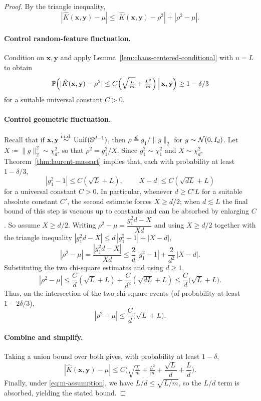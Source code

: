 \begin{proof}
By the triangle inequality,
\[
    |\hat K(\mathbf{x},\mathbf{y}) - \mu|
    \le
    |\hat K(\mathbf{x},\mathbf{y}) - \rho^2| + |\rho^2 - \mu|.
\]

\paragraph{Control random-feature fluctuation.}
Condition on $\mathbf{x},\mathbf{y}$ and apply Lemma~\ref{lem:chaos-centered-conditional} with $u=L$ to obtain
\[
    \mathbb{P}\Big(
        |\hat K(\mathbf{x},\mathbf{y}) - \rho^2|
        \le
        C\Big(\sqrt{\tfrac{L}{m}} + \tfrac{L^2}{m}\Big)
        \,\Big|\, \mathbf{x},\mathbf{y}
    \Big)
    \ge 1-\delta/3
\]
for a suitable universal constant $C>0$.

\paragraph{Control geometric fluctuation.}
Recall that if $\mathbf{x},\mathbf{y} \stackrel{\text{i.i.d.}}{\sim} \mathrm{Unif}(\mathbb{S}^{d-1})$, then $\rho \stackrel{d}{=} g_{1}/\|g\|_{2}$ for $g \sim \mathcal{N}(0,I_{d})$.
Let $X \coloneqq \|g\|_{2}^2 \sim \chi^2_{d}$, so that $\rho^2 = g_1^2/X$.
Since $g_1^2 \sim \chi^2_1$ and $X \sim \chi^2_d$, Theorem~\ref{thm:laurent-massart} implies that, each with probability at least $1-\delta/3$,
\[
    |g_1^2 - 1| \le C(\sqrt{L} + L),
    \qquad
    |X - d| \le C(\sqrt{dL} + L)
\]
for a universal constant $C>0$.
In particular, whenever $d \ge C'L$ for a suitable absolute constant $C'$, the second estimate forces $X \ge d/2$; when $d \lesssim L$ the final bound of this step is vacuous up to constants and can be absorbed by enlarging $C$. So assume $X \ge d/2$. Writing $\rho^2 - \mu = \dfrac{g_1^2 d - X}{Xd}$ and using $X \ge d/2$ together with the triangle inequality $|g_1^2 d - X| \le d\,|g_1^2 - 1| + |X - d|$,
\[
    |\rho^2 - \mu|
    =
    \frac{|g_1^2 d - X|}{Xd}
    \le
    \frac{2}{d}\,|g_1^2 - 1| + \frac{2}{d^2}\,|X - d|.
\]
Substituting the two chi-square estimates and using $d \ge 1$,
\[
    |\rho^2 - \mu|
    \le
    \frac{C}{d}(\sqrt{L} + L) + \frac{C}{d^2}(\sqrt{dL} + L)
    \le
    \frac{C}{d}\big(\sqrt{L} + L\big).
\]
Thus, on the intersection of the two chi-square events (of probability at least $1-2\delta/3$),
\[
    |\rho^2 - \mu|
    \le
    \frac{C}{d}\big(\sqrt{L} + L\big).
\]

\paragraph{Combine and simplify.}
Taking a union bound over both gives, with probability at least $1-\delta$,
\[
    |\hat K(\mathbf{x},\mathbf{y}) - \mu|
    \le
    C\Big(
        \sqrt{\tfrac{L}{m}} + \tfrac{L^2}{m} + \frac{\sqrt{L}}{d} + \frac{L}{d}
    \Big).
\]
Finally, under \eqref{eq:m-assumption}, we have $L/d \le \sqrt{L/m}$, so the $L/d$ term is absorbed, yielding the stated bound.
\end{proof}



